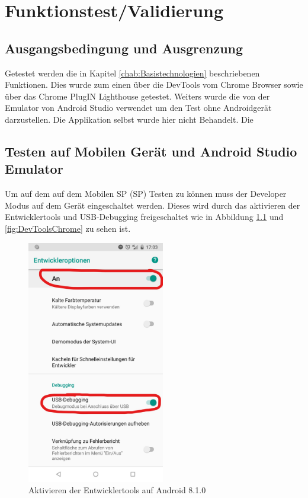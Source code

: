 \chapter{Funktionstest/Validierung}\label{chap:Funktionstest}
\thispagestyle{standard}
\pagestyle{standard}

\section{Ausgangsbedingung und Ausgrenzung}
Getestet werden die in Kapitel \ref{chab:Basistechnologien} beschriebenen Funktionen. Dies wurde zum einen über die DevTools vom Chrome Browser sowie über das Chrome PlugIN Lighthouse getestet. Weiters wurde die von der Emulator von Android Studio verwendet um den Test ohne Androidgerät darzustellen. Die Applikation selbst wurde hier nicht Behandelt.
Die 
 
\section{Testen auf Mobilen Gerät und Android Studio Emulator}
Um auf dem auf dem Mobilen \acl{SP} (\acs{SP}) Testen zu können muss der Developer Modus auf dem Gerät eingeschaltet werden. Dieses wird durch das aktivieren der Entwicklertools und USB-Debugging freigeschaltet wie in Abbildung \ref{fig:DevToolsAndorid} und \ref{fig:DevToolsChrome} zu sehen ist. 

\begin{figure}[h]
	\centering
	\includegraphics[width=6cm]{BilderAllgemein/DevToolsAndroid}\medskip
	\caption{Aktivieren der Entwicklertools auf Android 8.1.0}
	\label{fig:DevToolsAndorid}
\end{figure}

